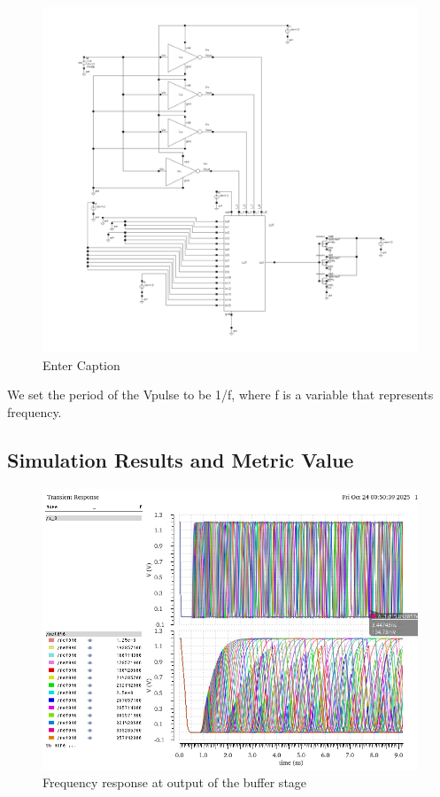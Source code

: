 \documentclass[12pt]{article}
\begin{document}
\begin{figure}[H]
    \centering
    \includegraphics[width=0.5\linewidth]{writeup//figures/lut_delay_testbench.png}
    \caption{Enter Caption}
\end{figure}
We set the period of the Vpulse to be 1/f, where f is a variable that represents frequency. 


\newpage

\subsection{Simulation Results and Metric Value}

\begin{figure}[H]
    \centering
    \includegraphics[width=0.75\linewidth]{writeup//figures/frequency_response_param.png}
    \caption{Frequency response at output of the buffer stage}
\end{figure}
\end{document}
